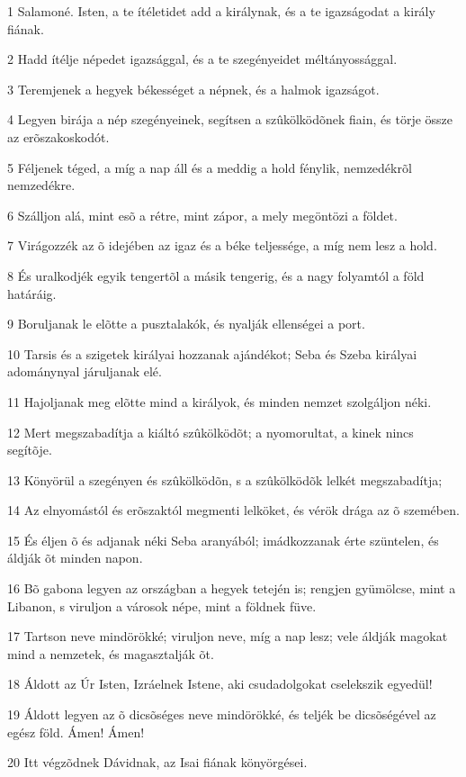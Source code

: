 \par 1 Salamoné. Isten, a te ítéletidet add a királynak, és a te igazságodat a király fiának.
\par 2 Hadd ítélje népedet igazsággal, és a te szegényeidet méltányossággal.
\par 3 Teremjenek a hegyek békességet a népnek, és a halmok igazságot.
\par 4 Legyen birája a nép szegényeinek, segítsen a szûkölködõnek fiain, és törje össze az erõszakoskodót.
\par 5 Féljenek téged, a míg a nap áll és a meddig a hold fénylik, nemzedékrõl nemzedékre.
\par 6 Szálljon alá, mint esõ a rétre, mint zápor, a mely megöntözi a földet.
\par 7 Virágozzék az õ idejében az igaz és a béke teljessége, a míg nem lesz a hold.
\par 8 És uralkodjék egyik tengertõl a másik tengerig, és a nagy folyamtól a föld határáig.
\par 9 Boruljanak le elõtte a pusztalakók, és nyalják ellenségei a port.
\par 10 Tarsis és a szigetek királyai hozzanak ajándékot; Seba és Szeba királyai adománynyal járuljanak elé.
\par 11 Hajoljanak meg elõtte mind a királyok, és minden nemzet szolgáljon néki.
\par 12 Mert megszabadítja a kiáltó szûkölködõt; a nyomorultat, a kinek nincs segítõje.
\par 13 Könyörül a szegényen és szûkölködõn, s a szûkölködõk lelkét megszabadítja;
\par 14 Az elnyomástól és erõszaktól megmenti lelköket, és vérök drága az õ szemében.
\par 15 És éljen õ és adjanak néki Seba aranyából; imádkozzanak érte szüntelen, és áldják õt minden napon.
\par 16 Bõ gabona legyen az országban a hegyek tetején is; rengjen gyümölcse, mint a Libanon, s viruljon a városok népe, mint a földnek füve.
\par 17 Tartson neve mindörökké; viruljon neve, míg a nap lesz; vele áldják magokat mind a nemzetek, és magasztalják õt.
\par 18 Áldott az Úr Isten, Izráelnek Istene, aki csudadolgokat cselekszik egyedül!
\par 19 Áldott legyen az õ dicsõséges neve mindörökké, és teljék be dicsõségével az egész föld. Ámen! Ámen!
\par 20 Itt végzõdnek Dávidnak, az Isai fiának könyörgései.

